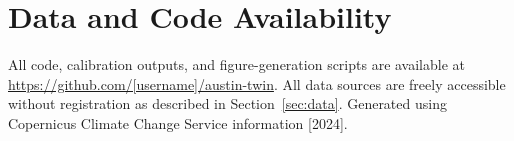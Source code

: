 \documentclass[12pt, letterpaper]{article}
\begin{document}
\section*{Data and Code Availability}
All code, calibration outputs, and figure-generation scripts are available at
\url{https://github.com/[username]/austin-twin}. All data sources are freely
accessible without registration as described in Section~\ref{sec:data}.
Generated using Copernicus Climate Change Service information [2024].


\end{document}
